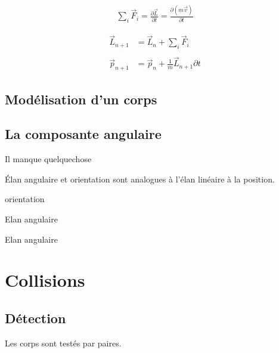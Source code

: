 \documentclass{beamer}
\newcommand{\deriv}{\partial \!}
\begin{document}
\begin{frame}
  
  \begin{align*}
    \sum_i \vec{F}_i = \frac{\deriv \vec{L}}{\deriv t} = \frac{\deriv (m\vec{v})}{\deriv t}
  \end{align*}

  \begin{align*}
    \vec{L}_{n+1} &= \vec{L}_n + {\sum_i \vec{F}_i} \\ \\
    \vec{p}_{n+1} &= \vec{p}_n + \frac{1}{m}\vec{L}_{n+1} \deriv t
  \end{align*}

\end{frame}

\subsection{Modélisation d'un corps}

\subsection{La composante angulaire}

\begin{frame}
  Il manque quelquechose

  \'Elan angulaire et orientation sont analogues à l'élan linéaire à la position.

  orientation
\end{frame}


\begin{frame}
  Elan angulaire
\end{frame}

\begin{frame}
  Elan angulaire
\end{frame}

\section{Collisions}

\subsection{Détection}

\begin{frame}  
  Les corps sont testés par paires.

  
\end{frame}
\end{document}
